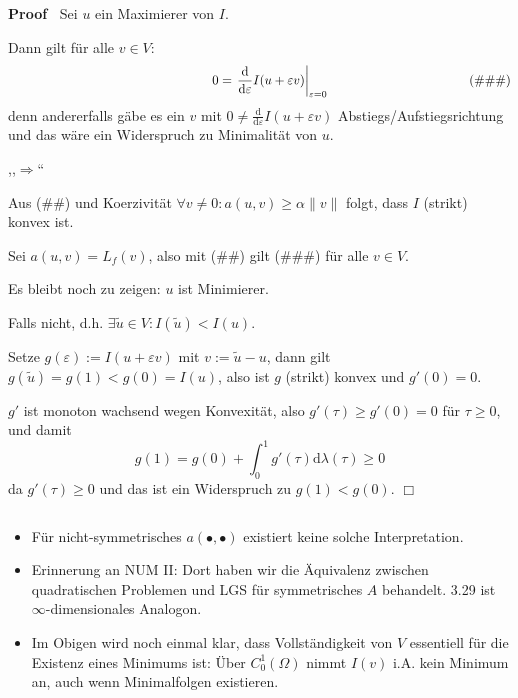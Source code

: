 \documentclass{book}
\newcommand{\assign}{:=}
\newcommand{\mathd}{\mathrm{d}}
\newcommand{\tmdummy}{$\mbox{}$}
\newenvironment{itemizedot}{\begin{itemize} \renewcommand{\labelitemi}{$\bullet$}\renewcommand{\labelitemii}{$\bullet$}\renewcommand{\labelitemiii}{$\bullet$}\renewcommand{\labelitemiv}{$\bullet$}}{\end{itemize}}
\newenvironment{proof}{\noindent\textbf{Proof\ }}{\hspace*{\fill}$\Box$\medskip}
\begin{document}
\begin{proof}
  Sei $u$ ein Maximierer von $I$.
  
  Dann gilt f{\"u}r alle $v \in V$:
  \[ \text{{\hspace{16em}}} 0 = \left. \frac{\mathd}{\mathd \varepsilon} I (u
     + \varepsilon v) \right|_{\varepsilon = 0} \hspace{11em} \text{(\#\#\#)}
  \]
  denn andererfalls g{\"a}be es ein $v$ mit $0 \neq \frac{\mathd}{\mathd
  \varepsilon} I (u + \varepsilon v)$ Abstiegs/Aufstiegsrichtung und das
  w{\"a}re ein Widerspruch zu Minimalit{\"a}t von $u$.
  
  ,,$\Rightarrow$``
  
  Aus (\#\#) und Koerzivit{\"a}t $\forall v \neq 0 : a (u, v) \geqslant \alpha
  \| v \|$ folgt, dass $I$ (strikt) konvex ist.
  
  Sei $a (u, v) = L_f (v)$, also mit (\#\#) gilt (\#\#\#) f{\"u}r alle $v \in
  V$.
  
  Es bleibt noch zu zeigen: $u$ ist Minimierer.
  
  Falls nicht, d.h. $\exists \tilde{u} \in V : I (\tilde{u}) < I (u) .$
  
  Setze $g (\varepsilon) \assign I (u + \varepsilon v)$ mit $v \assign
  \tilde{u} - u$, dann gilt $g (\tilde{u}) = g (1) < g (0) = I (u)$, also ist
  $g$ (strikt) konvex und $g' (0) = 0.$
  
  $g'$ ist monoton wachsend wegen Konvexit{\"a}t, also $g' (\tau) \geqslant g'
  (0) = 0$ f{\"u}r $\tau \geqslant 0$, und damit
  \[ g (1) = g (0) + \int_0^1 g' (\tau) \mathd \lambda  (\tau) \geqslant 0 \]
  da $g' (\tau) \geqslant 0$ und das ist ein Widerspruch zu $g (1) < g (0)$.
\end{proof}

\begin{remark*}
  {\tmdummy}
  
  \begin{itemizedot}
    \item F{\"u}r nicht-symmetrisches $a (\bullet, \bullet)$ existiert keine
    solche Interpretation.
    
    \item Erinnerung an NUM II: Dort haben wir die {\"A}quivalenz zwischen
    quadratischen Problemen und LGS f{\"u}r symmetrisches $A$ behandelt. 3.29
    ist $\infty$-dimensionales Analogon.
    
    \item Im Obigen wird noch einmal klar, dass Vollst{\"a}ndigkeit von $V$
    essentiell f{\"u}r die Existenz eines Minimums ist: {\"U}ber $C^1_0
    (\Omega)$ nimmt $I (v)$ i.A. kein Minimum an, auch wenn Minimalfolgen
    existieren. 
  \end{itemizedot}
\end{remark*}
\end{document}
